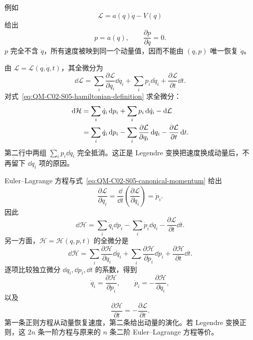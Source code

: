 例如
\begin{equation}
  \mathcal L=a(q)\dot q-V(q)
  \label{eq:QM-C02-S05-singular-lagrangian}
\end{equation}
给出
\[
  p=a(q),
  \qquad
  \frac{\partial p}{\partial\dot q}=0.
\]
$p$ 完全不含 $\dot q$，所有速度被映到同一个动量值，因而不能由 $(q,p)$ 唯一恢复 $\dot q$。


由 $\mathcal L=\mathcal L(q,\dot q,t)$，其全微分为
\begin{equation}
  \dd\mathcal L
  =\sum_i\frac{\partial\mathcal L}{\partial q_i}\dd q_i
  +\sum_i p_i\dd\dot q_i
  +\frac{\partial\mathcal L}{\partial t}\dd t.
  \label{eq:QM-C02-S05-differential-lagrangian}
\end{equation}
对式~\eqref{eq:QM-C02-S05-hamiltonian-definition} 求全微分：
\begin{align}
  \mathop{}\!\mathrm{d}\mathcal H
  &=\sum_i\dot q_i\mathop{}\!\mathrm{d} p_i
    +\sum_i p_i\mathop{}\!\mathrm{d}\dot q_i-\mathop{}\!\mathrm{d}\mathcal L \notag\\
  &=\sum_i\dot q_i\mathop{}\!\mathrm{d} p_i
    -\sum_i\frac{\partial\mathcal L}{\partial q_i}\mathop{}\!\mathrm{d} q_i
    -\frac{\partial\mathcal L}{\partial t}\mathop{}\!\mathrm{d} t.
  \label{eq:QM-C02-S05-differential-hamiltonian-first}
\end{align}
第二行中两组 $\sum_i p_i\dd\dot q_i$ 完全抵消。这正是 Legendre 变换把速度换成动量后，不再留下 $\dd\dot q_i$ 项的原因。

Euler--Lagrange 方程与式~\eqref{eq:QM-C02-S05-canonical-momentum} 给出
\begin{equation}
  \frac{\partial\mathcal L}{\partial q_i}
  =\frac{\dd}{\dd t}
    \left(\frac{\partial\mathcal L}{\partial\dot q_i}\right)
  =\dot p_i.
  \label{eq:QM-C02-S05-el-momentum}
\end{equation}
因此
\begin{equation}
  \dd\mathcal H
  =\sum_i\dot q_i\dd p_i
  -\sum_i\dot p_i\dd q_i
  -\frac{\partial\mathcal L}{\partial t}\dd t.
  \label{eq:QM-C02-S05-differential-hamiltonian-second}
\end{equation}
另一方面，$\mathcal H=\mathcal H(q,p,t)$ 的全微分是
\begin{equation}
  \dd\mathcal H
  =\sum_i\frac{\partial\mathcal H}{\partial q_i}\dd q_i
  +\sum_i\frac{\partial\mathcal H}{\partial p_i}\dd p_i
  +\frac{\partial\mathcal H}{\partial t}\dd t.
  \label{eq:QM-C02-S05-differential-hamiltonian-general}
\end{equation}
逐项比较独立微分 $\dd q_i,\dd p_i,\dd t$ 的系数，得到
\begin{equation}
  \boxed{
  \dot q_i=\frac{\partial\mathcal H}{\partial p_i},
  \qquad
  \dot p_i=-\frac{\partial\mathcal H}{\partial q_i},}
  \label{eq:QM-C02-S05-hamilton-equations}
\end{equation}
以及
\begin{equation}
  \boxed{
  \frac{\partial\mathcal H}{\partial t}
  =-\frac{\partial\mathcal L}{\partial t}.}
  \label{eq:QM-C02-S05-explicit-time}
\end{equation}
第一条正则方程从动量恢复速度，第二条给出动量的演化。若 Legendre 变换正则，这 $2n$ 条一阶方程与原来的 $n$ 条二阶 Euler--Lagrange 方程等价。

